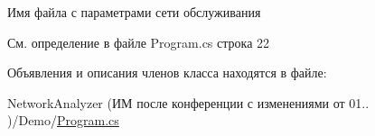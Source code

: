 Имя файла с параметрами сети обслуживания 



См. определение в файле Program.\+cs строка 22



Объявления и описания членов класса находятся в файле\+:\begin{DoxyCompactItemize}
\item 
Network\+Analyzer (ИМ после конференции  с изменениями от 01.. )/\+Demo/\hyperlink{_demo_2_program_8cs}{Program.\+cs}\end{DoxyCompactItemize}
